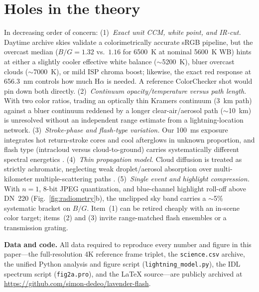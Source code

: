 \documentclass[11pt,a4paper]{article}
\newcommand{\code}[1]{\texttt{\small #1}}
\begin{document}
\section{Holes in the theory}
\label{sec:holes}
In decreasing order of concern:
(1)~\emph{Exact unit CCM, white point, and IR-cut.} Daytime archive skies
validate a colorimetrically accurate sRGB pipeline, but the overcast median
($B/G=1.32$ vs.\ $1.16$ for 6500~K at nominal 5600~K WB) hints at either a
slightly cooler effective white balance ($\sim$5200~K), bluer overcast clouds
($\sim$7000~K), or mild ISP chroma boost; likewise, the exact red response at
656.3~nm controls how much H$\alpha$ is needed. A reference ColorChecker shot
would pin down both directly.
(2)~\emph{Continuum opacity/temperature versus path length.} With two color
ratios, trading an optically thin Kramers continuum (3~km path) against a
bluer continuum reddened by a longer clear-air/aerosol path ($\sim$10~km) is
unresolved without an independent range estimate from a lightning-location
network.
(3)~\emph{Stroke-phase and flash-type variation.} Our 100~ms exposure
integrates hot return-stroke cores and cool afterglows in unknown proportion,
and flash type (intracloud versus cloud-to-ground) carries systematically
different spectral energetics \citep{rakovuman2003,walker2019}.
(4)~\emph{Thin propagation model.} Cloud diffusion is treated as strictly
achromatic, neglecting weak droplet/aerosol absorption over multi-kilometer
multiple-scattering paths \citep{thomasonkrider1982}.
(5)~\emph{Single event and highlight compression.} With $n=1$, 8-bit JPEG
quantization, and blue-channel highlight roll-off above DN~220
(Fig.~\ref{fig:radiometry}b), the unclipped sky band carries a $\sim$5\%
systematic bracket on $B/G$. Item~(1) can be retired cheaply with an in-scene
color target; items~(2) and (3) invite range-matched flash ensembles or a
transmission grating.

\vspace{0.5em}
\noindent\textbf{Data and code.} All data required to reproduce every number
and figure in this paper---the full-resolution 4K reference frame triplet, the
\code{science.csv} archive, the unified Python analysis and figure script
(\code{lightning\_model.py}), the IDL spectrum script (\code{fig2a.pro}), and
the LaTeX source---are publicly archived at
\url{https://github.com/simon-dedeo/lavender-flash}.
\end{document}
